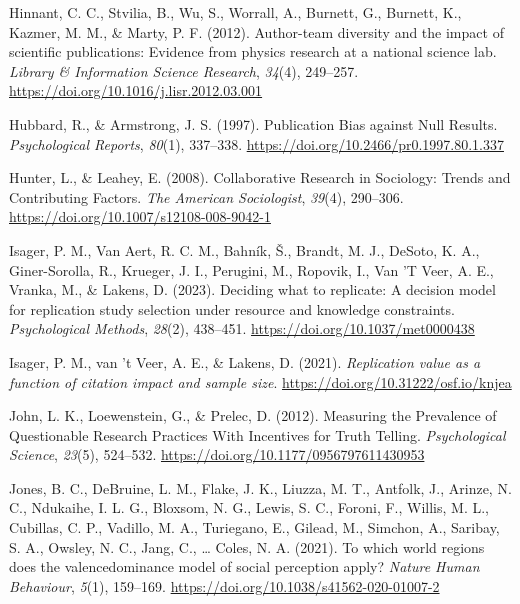 \documentclass[
  man,mask,floatsintext]{apa7}
\newlength{\cslhangindent}
\newlength{\cslentryspacingunit} %
\newenvironment{CSLReferences}[2] %
 {%
  \setlength{\parindent}{0pt}
  \ifodd #1
  \let\oldpar\par
  \def\par{\hangindent=\cslhangindent\oldpar}
  \fi
  \setlength{\parskip}{#2\cslentryspacingunit}
 }%
 {}
\begin{document}
\begin{CSLReferences}{1}{0}
\leavevmode{}%
Hinnant, C. C., Stvilia, B., Wu, S., Worrall, A., Burnett, G., Burnett, K., Kazmer, M. M., \& Marty, P. F. (2012). Author-team diversity and the impact of scientific publications: Evidence from physics research at a national science lab. \emph{Library \& Information Science Research}, \emph{34}(4), 249--257. \url{https://doi.org/10.1016/j.lisr.2012.03.001}

\leavevmode{}%
Hubbard, R., \& Armstrong, J. S. (1997). Publication Bias against Null Results. \emph{Psychological Reports}, \emph{80}(1), 337--338. \url{https://doi.org/10.2466/pr0.1997.80.1.337}

\leavevmode{}%
Hunter, L., \& Leahey, E. (2008). Collaborative Research in Sociology: Trends and Contributing Factors. \emph{The American Sociologist}, \emph{39}(4), 290--306. \url{https://doi.org/10.1007/s12108-008-9042-1}

\leavevmode{}%
Isager, P. M., Van Aert, R. C. M., Bahník, Š., Brandt, M. J., DeSoto, K. A., Giner-Sorolla, R., Krueger, J. I., Perugini, M., Ropovik, I., Van 'T Veer, A. E., Vranka, M., \& Lakens, D. (2023). Deciding what to replicate: {A} decision model for replication study selection under resource and knowledge constraints. \emph{Psychological Methods}, \emph{28}(2), 438--451. \url{https://doi.org/10.1037/met0000438}

\leavevmode{}%
Isager, P. M., van 't Veer, A. E., \& Lakens, D. (2021). \emph{Replication value as a function of citation impact and sample size}. \url{https://doi.org/10.31222/osf.io/knjea}

\leavevmode{}%
John, L. K., Loewenstein, G., \& Prelec, D. (2012). Measuring the Prevalence of Questionable Research Practices With Incentives for Truth Telling. \emph{Psychological Science}, \emph{23}(5), 524--532. \url{https://doi.org/10.1177/0956797611430953}

\leavevmode{}%
Jones, B. C., DeBruine, L. M., Flake, J. K., Liuzza, M. T., Antfolk, J., Arinze, N. C., Ndukaihe, I. L. G., Bloxsom, N. G., Lewis, S. C., Foroni, F., Willis, M. L., Cubillas, C. P., Vadillo, M. A., Turiegano, E., Gilead, M., Simchon, A., Saribay, S. A., Owsley, N. C., Jang, C., \ldots{} Coles, N. A. (2021). To which world regions does the valence{\textendash}dominance model of social perception apply? \emph{Nature Human Behaviour}, \emph{5}(1), 159--169. \url{https://doi.org/10.1038/s41562-020-01007-2}


\end{CSLReferences}
\end{document}
